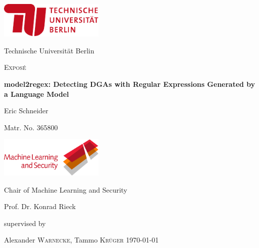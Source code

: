 \documentclass[a4paper, 12pt]{article}
\newcommand{\thesistitle}{model2regex: Detecting DGAs with Regular Expressions Generated by a Language Model}
\newcommand{\thesisauthor}{Eric Schneider}
\newcommand{\matrno}{365800}
\newcommand{\supervisor}{Alexander \textsc{Warnecke}, Tammo \textsc{Kr\"uger}}
\begin{document}
\begin{titlepage}
	\centering
	\includegraphics[width=5cm]{tub-logo}\par\vspace{0.5cm}
	{Technische Universität Berlin \par}
	\vspace{2cm}
	{\large \textsc{Exposé}\par}
	\vspace{1cm}
	{\Large\bfseries \thesistitle\par}
	\vspace{2cm}
	{\large \thesisauthor\par}
	{\large Matr. No. \matrno\par}
	\vspace{2cm}
	\includegraphics[width=5cm]{mlsec-logo-red2}\par\vspace{0.5cm}
	{Chair of Machine Learning and Security \par}
	{Prof. Dr. Konrad Rieck \par}
	\vfill
	supervised by\par
	\supervisor
	\vfill
	\today\par
\end{titlepage}
\end{document}
